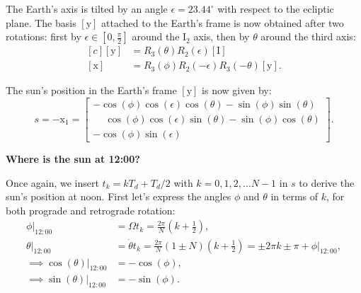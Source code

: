 \documentclass[12pt]{article}
\begin{document}
The Earth's axis is tilted by an angle $\epsilon=23.44^\circ$ with respect to
the ecliptic plane. The basis $[\mathrm{y}]$ attached to the Earth's frame is 
now obtained after two rotations: first by $\epsilon \in [0,\tfrac{\pi}{2}]$ around the $\mathrm{I}_2$ 
axis, then by $\theta$ around the third axis:
\begin{equation}
    \begin{aligned}[c]
        [ \mathrm{y} ] &= R_3(\theta) R_2(\epsilon) [\mathrm{I}] \\
        [ \mathrm{x} ] &= R_3(\phi) R_2(-\epsilon) R_3(-\theta)[\mathrm{y}].
    \end{aligned}
\end{equation}

The sun's position in the Earth's frame $[\mathrm{y}]$ is now given by:
\begin{equation}
    s = -\mathrm{x}_1 =
    \begin{bmatrix}
        -\cos(\phi)\cos(\epsilon)\cos(\theta) - \sin(\phi)\sin(\theta)\\
        \phantom{+}\cos(\phi)\cos(\epsilon)\sin(\theta)-\sin(\phi) \cos(\theta)\\
        -\cos(\phi)\sin(\epsilon)\phantom{\sin(\theta)+\sin(\phi) \cos(\theta)}
    \end{bmatrix}.
    \label{eq:position}
\end{equation}

\textbf{Where is the sun at 12:00?}

Once again, we insert $t_{k}=kT_d + T_d/2$ with $k=0,1,2,\ldots N-1$ 
in $s$ to derive the sun's position at noon. 
First let's express the angles $\phi$ and $\theta$ in terms of $k$,
for both prograde and retrograde rotation:
    \begin{align}
        \phi\vert_{12:00} &= \Omega t_{k} = \tfrac{2\pi}{N} (k+ \tfrac{1}{2}),\\
        \theta\vert_{12:00} &= \dot\theta t_{k} = \tfrac{2\pi}{N} (1 \pm N) (k+\tfrac{1}{2})
        = \pm2\pi k \pm \pi + \phi\vert_{12:00},\\[6pt]
        \implies \cos(\theta)\vert_{12:00} &= -\cos\left(\phi\right),\\
        \implies \sin(\theta)\vert_{12:00} &= -\sin\left(\phi\right).
    \end{align}
\end{document}
